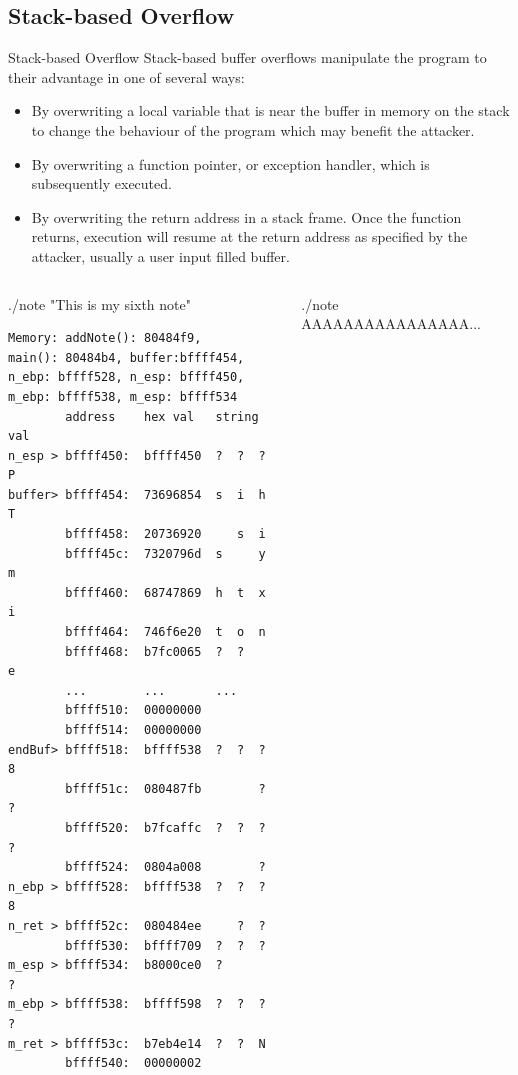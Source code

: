 \subsection{Stack-based Overflow}
\begin{frame}{Stack-based Overflow}
	Stack-based buffer overflows manipulate the program to their advantage in one of several ways:
	\begin{itemize}
		\item By overwriting a local variable that is near the buffer in memory on the stack to change the behaviour of the program which may benefit the attacker.
		\item By overwriting a function pointer, or exception handler, which is subsequently executed.
		\item By overwriting the return address in a stack frame. Once the function returns, execution will resume at the return address as specified by the attacker, usually a user input filled buffer.
	\end{itemize}
\framebreak
\begin{columns}[T]
	\begin{column}{.5\textwidth}
	\tiny\begin{block}{./note "This is my sixth note"}
	\tiny\begin{verbatim}
Memory: addNote(): 80484f9,
main(): 80484b4, buffer:bffff454,
n_ebp: bffff528, n_esp: bffff450,
m_ebp: bffff538, m_esp: bffff534
        address    hex val   string val
n_esp > bffff450:  bffff450  ?  ?  ?  P
buffer> bffff454:  73696854  s  i  h  T
        bffff458:  20736920     s  i   
        bffff45c:  7320796d  s     y  m
        bffff460:  68747869  h  t  x  i
        bffff464:  746f6e20  t  o  n   
        bffff468:  b7fc0065  ?  ?     e
        ...        ...       ...
        bffff510:  00000000           
        bffff514:  00000000           
endBuf> bffff518:  bffff538  ?  ?  ?  8
        bffff51c:  080487fb        ?  ?
        bffff520:  b7fcaffc  ?  ?  ?  ?
        bffff524:  0804a008        ?  
n_ebp > bffff528:  bffff538  ?  ?  ?  8
n_ret > bffff52c:  080484ee     ?  ?
        bffff530:  bffff709  ?  ?  ?  	
m_esp > bffff534:  b8000ce0  ?        ?
m_ebp > bffff538:  bffff598  ?  ?  ?  ?
m_ret > bffff53c:  b7eb4e14  ?  ?  N  
        bffff540:  00000002	       
	\end{verbatim}
	\end{block}
	\end{column}
	\begin{column}{.5\textwidth}
	\tiny\begin{block}{./note AAAAAAAAAAAAAAAA...}

\end{block}
\end{column}
\end{columns}
\end{frame}
